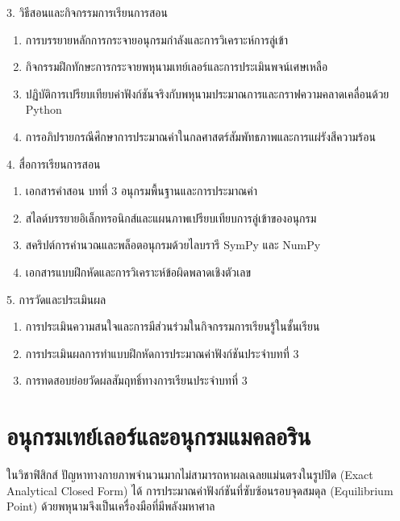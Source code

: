 \newpage

\begin{planbox}[colframe=rbruNavy!85!black, colbacktitle=rbruNavy!85!black]{3. วิธีสอนและกิจกรรมการเรียนการสอน}
\begin{enumerate}[topsep=2pt, itemsep=1pt, partopsep=0pt, parsep=0pt, leftmargin=1.5em]
    \item การบรรยายหลักการกระจายอนุกรมกำลังและการวิเคราะห์การลู่เข้า
    \item กิจกรรมฝึกทักษะการกระจายพหุนามเทย์เลอร์และการประเมินพจน์เศษเหลือ
    \item ปฏิบัติการเปรียบเทียบค่าฟังก์ชันจริงกับพหุนามประมาณการและกราฟความคลาดเคลื่อนด้วย Python
    \item การอภิปรายกรณีศึกษาการประมาณค่าในกลศาสตร์สัมพัทธภาพและการแผ่รังสีความร้อน
\end{enumerate}
\end{planbox}

\begin{planbox}[colframe=rbruGold!90!black, colbacktitle=rbruGold!90!black]{4. สื่อการเรียนการสอน}
\begin{enumerate}[topsep=2pt, itemsep=1pt, partopsep=0pt, parsep=0pt, leftmargin=1.5em]
    \item เอกสารคำสอน บทที่ 3 อนุกรมพื้นฐานและการประมาณค่า
    \item สไลด์บรรยายอิเล็กทรอนิกส์และแผนภาพเปรียบเทียบการลู่เข้าของอนุกรม
    \item สคริปต์การคำนวณและพล็อตอนุกรมด้วยไลบรารี SymPy และ NumPy
    \item เอกสารแบบฝึกหัดและการวิเคราะห์ข้อผิดพลาดเชิงตัวเลข
\end{enumerate}
\end{planbox}

\begin{planbox}[colframe=rbruSlate, colbacktitle=rbruSlate]{5. การวัดและประเมินผล}
\begin{enumerate}[topsep=2pt, itemsep=1pt, partopsep=0pt, parsep=0pt, leftmargin=1.5em]
    \item การประเมินความสนใจและการมีส่วนร่วมในกิจกรรมการเรียนรู้ในชั้นเรียน
    \item การประเมินผลการทำแบบฝึกหัดการประมาณค่าฟังก์ชันประจำบทที่ 3
    \item การทดสอบย่อยวัดผลสัมฤทธิ์ทางการเรียนประจำบทที่ 3
\end{enumerate}
\end{planbox}
\clearpage

\section{อนุกรมเทย์เลอร์และอนุกรมแมคลอริน}
ในวิชาฟิสิกส์ ปัญหาทางกายภาพจำนวนมากไม่สามารถหาผลเฉลยแม่นตรงในรูปปิด (Exact Analytical Closed Form) ได้ การประมาณค่าฟังก์ชันที่ซับซ้อนรอบจุดสมดุล (Equilibrium Point) ด้วยพหุนามจึงเป็นเครื่องมือที่มีพลังมหาศาล

